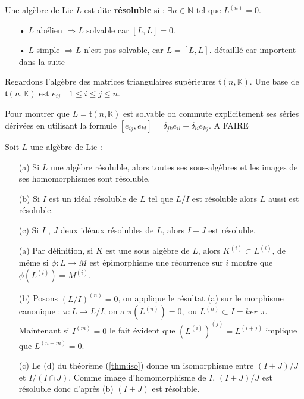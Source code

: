 \documentclass[a4paper,openany,12pt]{report}
\newcommand{\KK}{\mathbb{K}}
\newcommand{\NN}{\mathbb{N}}
\newcommand{\ttt}{\mathfrak{t}}
\theoremstyle{break}
{\theorembodyfont{\upshape}
\newtheorem*{rmq}{Remarque :}
\newtheorem*{prv}{Preuve :}
\newtheorem*{ex}{Exemples :}
\newtheorem{exe}{Exemple : }
\newtheorem*{nota}{Notation :}}
\begin{document}
\begin{df}
\quad Une algèbre de Lie $L$ est dite \textbf{résoluble} si : $\exists n \in \NN $ tel que $L^{(n)}=0$.
\end{df}

\begin{rmq}
\begin{itemize}
\item[•]  $L$ abélien $\Rightarrow L$ solvable car $[L,L] = 0$.
\item[•]  $L$ simple $\Rightarrow L$ n'est pas solvable, car $L = [L,L]$.
détailllé car importent dans la suite
\end{itemize}
\end{rmq}

\begin{ex}
\quad Regardons l'algèbre des matrices triangulaires supérieures $\ttt(n,\KK)$. Une base de $\ttt(n,\KK)$ est $e_{ij}\quad1\leq i \leq j\leq n$.

Pour montrer que $L = \ttt(n,\KK)$  est solvable on commute explicitement ses séries dérivées en utilisant la formule $ [ e_{ij},e_{kl} ]  = \delta_{jk}e_{il}  -  \delta_{li}e_{kj} $.
A FAIRE 
\end{ex}

\begin{prop}\label{prop:solv}
Soit $L$ une algèbre de Lie :
\begin{itemize}
\item[(a)] Si $L$ une algèbre résoluble, alors toutes ses sous-algèbres et les images de ses homomorphismes sont résoluble.
\item[(b)] Si $I$ est un idéal résoluble de $L$ tel que $L/I$ est résoluble alors $L$ aussi est résoluble.
\item[(c)] Si $I$ , $J$ deux idéaux résolubles de $L$, alors $I+J$ est résoluble.
\end{itemize}
\end{prop}

\begin{prv}
\begin{enumerate}
\item[(a)] Par définition, si $K$ est une sous algèbre de $L$, alors $K^{(i)} \subset L^{(i)}$, de même si $\phi: L \rightarrow M$ est épimorphisme une récurrence sur $i$ montre que $\phi\left(L^{(i)}\right)=M^{(i)}$.

\item[(b)] Posons $(L / I)^{(n)}=0$, on applique le résultat (a) sur le morphisme canonique : $\pi: L \rightarrow L / I$, on a  $\pi\left(L^{(n)}\right)=0,$ ou  $L^{(n)} \subset I= ker$ $\pi$. Maintenant si  $I^{(m)}=0$ le fait évident que $\left(L^{(i)}\right)^{(j)}=L^{(i+j)}$ implique que  $L^{(n+m)}=0$. 

\item[(c)] Le (d) du théorème (\ref{thm:iso}) donne un isomorphisme entre $(I+J) / J$ et $I /(I \cap J)$. Comme image d'homomorphisme de $I$, $(I+J) / J$  est résoluble donc d'après (b)  $(I+J)$ est résoluble.
\end{enumerate}
\end{prv}
\end{document}
